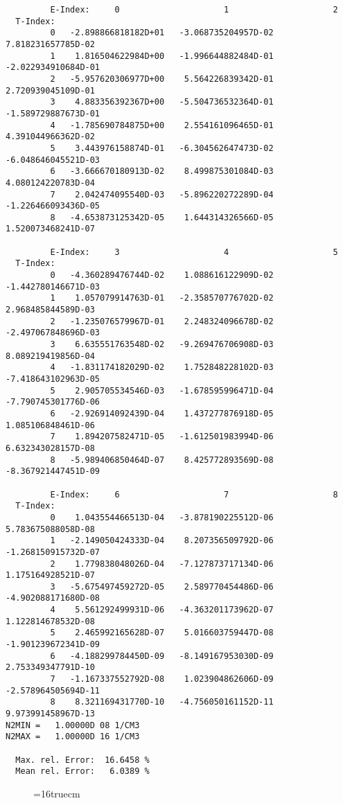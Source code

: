 \documentclass[12pt,dvipdfmx]{article}
\begin{document}
\begin{small}\begin{verbatim}
         E-Index:     0                     1                     2
  T-Index:
         0   -2.898866818182D+01   -3.068735204957D-02    7.818231657785D-02
         1    1.816504622984D+00   -1.996644882484D-01   -2.022934910684D-01
         2   -5.957620306977D+00    5.564226839342D-01    2.720939045109D-01
         3    4.883356392367D+00   -5.504736532364D-01   -1.589729887673D-01
         4   -1.785690784875D+00    2.554161096465D-01    4.391044966362D-02
         5    3.443976158874D-01   -6.304562647473D-02   -6.048646045521D-03
         6   -3.666670180913D-02    8.499875301084D-03    4.080124220783D-04
         7    2.042474095540D-03   -5.896220272289D-04   -1.226466093436D-05
         8   -4.653873125342D-05    1.644314326566D-05    1.520073468241D-07

         E-Index:     3                     4                     5
  T-Index:
         0   -4.360289476744D-02    1.088616122909D-02   -1.442780146671D-03
         1    1.057079914763D-01   -2.358570776702D-02    2.968485844589D-03
         2   -1.235076579967D-01    2.248324096678D-02   -2.497067848696D-03
         3    6.635551763548D-02   -9.269476706908D-03    8.089219419856D-04
         4   -1.831174182029D-02    1.752848228102D-03   -7.418643102963D-05
         5    2.905705534546D-03   -1.678595996471D-04   -7.790745301776D-06
         6   -2.926914092439D-04    1.437277876918D-05    1.085106848461D-06
         7    1.894207582471D-05   -1.612501983994D-06    6.632343028157D-08
         8   -5.989406850464D-07    8.425772893569D-08   -8.367921447451D-09

         E-Index:     6                     7                     8
  T-Index:
         0    1.043554466513D-04   -3.878190225512D-06    5.783675088058D-08
         1   -2.149050424333D-04    8.207356509792D-06   -1.268150915732D-07
         2    1.779838048026D-04   -7.127873717134D-06    1.175164928521D-07
         3   -5.675497459272D-05    2.589770454486D-06   -4.902088171680D-08
         4    5.561292499931D-06   -4.363201173962D-07    1.122814678532D-08
         5    2.465992165628D-07    5.016603759447D-08   -1.901239672341D-09
         6   -4.188299784450D-09   -8.149167953030D-09    2.753349347791D-10
         7   -1.167337552792D-08    1.023904862606D-09   -2.578964505694D-11
         8    8.321169431770D-10   -4.756050161152D-11    9.973991458967D-13
N2MIN =   1.00000D 08 1/CM3
N2MAX =   1.00000D 16 1/CM3

  Max. rel. Error:  16.6458 %
  Mean rel. Error:   6.0389 %

\end{verbatim}\end{small}
\begin{figure} \label{2.3.2B0}
\epsfxsize=16truecm
\end{figure}
\newpage
\end{document}
